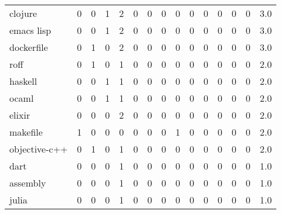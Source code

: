 \begin{tabular}{lrrrrrrrrrrrrrr}
clojure       &        0 &       0 &          1 &               2 &                0 &       0 &          0 &          0 &         0 &         0 &      0 &             0 &         0 &      3.0 \\
emacs lisp    &        0 &       0 &          1 &               2 &                0 &       0 &          0 &          0 &         0 &         0 &      0 &             0 &         0 &      3.0 \\
dockerfile    &        0 &       1 &          0 &               2 &                0 &       0 &          0 &          0 &         0 &         0 &      0 &             0 &         0 &      3.0 \\
roff          &        0 &       1 &          0 &               1 &                0 &       0 &          0 &          0 &         0 &         0 &      0 &             0 &         0 &      2.0 \\
haskell       &        0 &       0 &          1 &               1 &                0 &       0 &          0 &          0 &         0 &         0 &      0 &             0 &         0 &      2.0 \\
ocaml         &        0 &       0 &          1 &               1 &                0 &       0 &          0 &          0 &         0 &         0 &      0 &             0 &         0 &      2.0 \\
elixir        &        0 &       0 &          0 &               2 &                0 &       0 &          0 &          0 &         0 &         0 &      0 &             0 &         0 &      2.0 \\
makefile      &        1 &       0 &          0 &               0 &                0 &       0 &          0 &          1 &         0 &         0 &      0 &             0 &         0 &      2.0 \\
objective-c++ &        0 &       1 &          0 &               1 &                0 &       0 &          0 &          0 &         0 &         0 &      0 &             0 &         0 &      2.0 \\
dart          &        0 &       0 &          0 &               1 &                0 &       0 &          0 &          0 &         0 &         0 &      0 &             0 &         0 &      1.0 \\
assembly      &        0 &       0 &          0 &               1 &                0 &       0 &          0 &          0 &         0 &         0 &      0 &             0 &         0 &      1.0 \\
julia         &        0 &       0 &          0 &               1 &                0 &       0 &          0 &          0 &         0 &         0 &      0 &             0 &         0 &      1.0 \\

\end{tabular}
